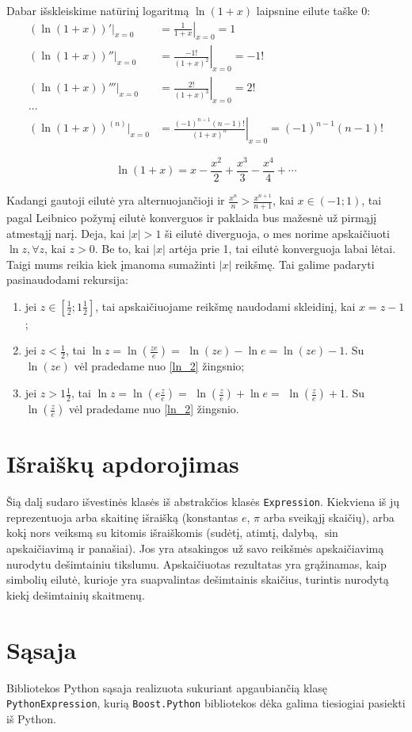 Dabar išskleiskime natūrinį logaritmą $\ln (1+x)$ laipsnine eilute 
taške $0$:
\begin{align*}
  (\ln (1 + x))'|_{x=0} &= \left. \frac{1}{1+x} \right|_{x=0} = 1 \\
  (\ln (1 + x))''|_{x=0} &= \left. \frac{-1!}{(1+x)^{2}} \right|_{x=0} %
    = -1! \\
  (\ln (1 + x))'''|_{x=0} &= \left. \frac{2!}{(1+x)^{3}} \right|_{x=0} %
    = 2! \\
  \cdots \\
  (\ln (1 + x))^{(n)}|_{x=0} &= %
    \left. \frac{(-1)^{n-1}(n-1)!}{(1+x)^{n}} \right|_{x=0} = %
    (-1)^{n-1}(n-1)!
\end{align*}

\begin{equation}
  \ln (1 + x) = x - \frac{x^2}{2} + \frac{x^3}{3} - \frac{x^4}{4} + \cdots
  \label{ln_1}
\end{equation}

Kadangi gautoji eilutė yra alternuojančioji ir 
$\frac{x^n}{n} > \frac{x^{n+1}}{n+1}$, kai $x \in (-1; 1)$, tai pagal 
Leibnico požymį eilutė konverguos ir paklaida bus mažesnė už pirmąjį
atmestąjį narį. Deja, kai $|x| > 1$ ši eilutė diverguoja, o mes
norime apskaičiuoti $\ln z, \forall z$, kai $z > 0$. Be to, 
kai $|x|$ artėja prie 1, tai eilutė konverguoja labai lėtai. Taigi
mums reikia kiek įmanoma sumažinti $|x|$ reikšmę. Tai galime padaryti
pasinaudodami rekursija:
\begin{enumerate}
  \item \label{ln_2} jei $z \in \left[ \frac{1}{2}; 1\frac{1}{2} \right]$, 
    tai apskaičiuojame reikšmę naudodami skleidinį, kai $x = z - 1$;
  \item jei $z < \frac{1}{2}$, tai 
    $\ln z = \ln \left( \frac{ze}{e} \right) =$
    $\ln (ze) - \ln e = \ln (ze) - 1$. Su $\ln (ze)$ vėl pradedame
    nuo \ref{ln_2} žingsnio;
  \item jei $z > 1\frac{1}{2}$, tai 
    $\ln z = \ln \left( e\frac{z}{e} \right) =$
    $\ln \left( \frac{z}{e} \right) + \ln e =$
    $\ln \left( \frac{z}{e} \right) + 1$. Su 
    $\ln \left( \frac{z}{e} \right)$ vėl pradedame nuo \ref{ln_2}
    žingsnio.
\end{enumerate}

\section{Išraiškų apdorojimas}

Šią dalį sudaro išvestinės klasės iš abstrakčios klasės \verb|Expression|.
Kiekviena iš jų reprezentuoja arba skaitinę išraišką (konstantas $e$,
$\pi$ arba sveikąjį skaičių), arba kokį nors veiksmą su kitomis išraiškomis
(sudėtį, atimtį, dalybą, $\sin$ apskaičiavimą ir panašiai). Jos yra 
atsakingos už savo reikšmės apskaičiavimą nurodytu dešimtainiu tikslumu.
Apskaičiuotas rezultatas yra grąžinamas, kaip simbolių eilutė, kurioje yra
suapvalintas dešimtainis skaičius, turintis nurodytą kiekį dešimtainių
skaitmenų.

\section{Sąsaja}

Bibliotekos Python sąsaja realizuota sukuriant apgaubiančią klasę
\verb|PythonExpression|, kurią \verb|Boost.Python| bibliotekos dėka
galima tiesiogiai pasiekti iš Python.
